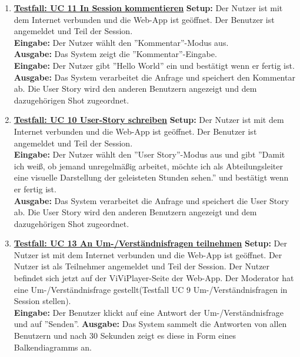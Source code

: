 \begin{enumerate}
	\item \underline{\textbf{Testfall: UC 11 In Session kommentieren}} \linebreak
	\textbf{Setup:} Der Nutzer ist mit dem Internet verbunden und die Web-App ist geöffnet. Der Benutzer ist angemeldet und Teil der Session.\\
	\textbf{Eingabe:} Der Nutzer wählt den ''Kommentar''-Modus aus. \\
	\textbf{Ausgabe:} Das System zeigt die ''Kommentar''-Eingabe. \\
	\textbf{Eingabe:} Der Nutzer gibt ''Hello World'' ein und bestätigt wenn er fertig ist.\\
	\textbf{Ausgabe:} Das System verarbeitet die Anfrage und speichert den Kommentar ab. Die User Story wird den anderen Benutzern angezeigt und dem dazugehörigen Shot zugeordnet. \linebreak \linebreak \linebreak \linebreak
	
	\item \underline{\textbf{Testfall: UC 10 User-Story schreiben}} \linebreak
	\textbf{Setup:} Der Nutzer ist mit dem Internet verbunden und die Web-App ist geöffnet. Der Benutzer ist angemeldet und Teil der Session.\\
	\textbf{Eingabe:} Der Nutzer wählt den ''User Story''-Modus aus und gibt ''Damit ich weiß, ob jemand unregelmäßig arbeitet, möchte ich als Abteilungsleiter eine visuelle Darstellung der geleisteten Stunden sehen.'' und bestätigt wenn er fertig ist.\\
	\textbf{Ausgabe:} Das System verarbeitet die Anfrage und speichert die User Story ab. Die User Story wird den anderen Benutzern angezeigt und dem dazugehörigen Shot zugeordnet. \\
	
	\item \underline{\textbf{Testfall: UC 13 An Um-/Verständnisfragen teilnehmen}} \linebreak
	\textbf{Setup:} Der Nutzer ist mit dem Internet verbunden und die Web-App ist geöffnet. Der Nutzer ist als Teilnehmer angemeldet und Teil der Session. Der Nutzer befindet sich jetzt auf der ViViPlayer-Seite der Web-App. Der Moderator hat eine Um-/Verständnisfrage gestellt(Testfall UC 9 Um-/Verständnisfragen in Session stellen).\\
	\textbf{Eingabe:} Der Benutzer klickt auf eine Antwort der Um-/Verständnisfrage und auf ''Senden''.
	\textbf{Ausgabe:} Das System sammelt die Antworten von allen Benutzern und nach 30 Sekunden zeigt es diese in Form eines Balkendiagramms an.
	

\end{enumerate}
